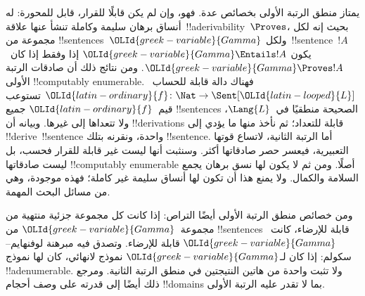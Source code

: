 \documentclass[../../../include/open-logic-section]{subfiles}
\begin{document}


يمتاز منطق الرتبة الأولى بخصائص عدة. فهو، وإن لم يكن قابلًا للقرار،
قابل للمحورة: له أنساق برهان سليمة وكاملة تنشأ عنها
علاقة~!!a{derivability}~$\Proves$، بحيث إنه لكل مجموعة من
!!{sentence}s~${\OLId{greek-variable}{Gamma}}$ ولكل~!!{sentence}~$!A$ يكون
${\OLId{greek-variable}{Gamma}} \Entails !A$ إذا وفقط إذا كان~${\OLId{greek-variable}{Gamma}} \Proves !A$.
ومن نتائج ذلك أن صادقات الرتبة الأولى !!{computably
  enumerable}. فهناك دالة قابلة للحساب~${\OLId{latin-ordinary}{f}}\colon \Nat \to
\Sent[{\OLId{latin-looped}{L}}]$ تستوعب قيم~${\OLId{latin-ordinary}{f}}$ جميع !!{sentence}s الصحيحة منطقيًا
في~$\Lang{L}$، ولا تتعداها إلى غيرها.
وبيانه أن !!{derivation}s قابلة للتعداد؛ ثم نأخذ منها ما
يؤدي إلى !!{derive}~!!{sentence} واحدة، ونقرنه بتلك
!!{sentence}. أما الرتبة الثانية، لاتساع قوتها التعبيرية،
فيعسر حصر صادقاتها أكثر. وسنثبت أنها ليست غير قابلة للقرار
فحسب، بل ليست صادقاتها !!{computably
  enumerable} أصلًا. ومن ثم لا يكون لها نسق برهان يجمع
السلامة والكمال. ولا يمنع هذا أن تكون لها أنساق سليمة غير كاملة؛
فهذه موجودة، وهي من مسائل البحث المهمة.

ومن خصائص منطق الرتبة الأولى أيضًا التراص: إذا كانت كل مجموعة
جزئية منتهية من مجموعة~${\OLId{greek-variable}{Gamma}}$ من !!{sentence}s قابلة للإرضاء،
كانت~${\OLId{greek-variable}{Gamma}}$ قابلة للإرضاء. وتصدق فيه مبرهنة لوفنهايم--سكولم:
إذا كان لـ${\OLId{greek-variable}{Gamma}}$ نموذج لانهائي، كان لها نموذج !!a{denumerable}.
ولا تثبت واحدة من هاتين النتيجتين في منطق الرتبة الثانية.
ومرجع ذلك أيضًا إلى قدرته على وصف أحجام !!{domain}s
بما لا تقدر عليه الرتبة الأولى.
\end{document}
